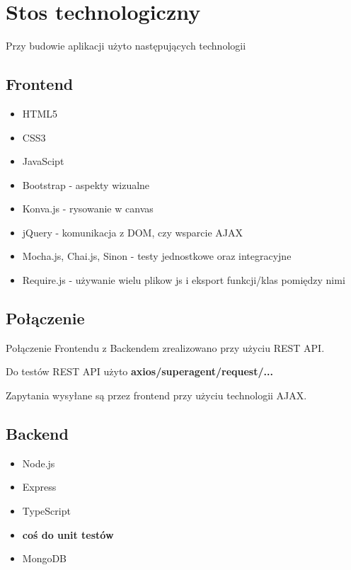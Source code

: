 \section{Stos technologiczny}

Przy budowie aplikacji użyto następujących technologii

\subsection{Frontend}
\begin{itemize}
	\item HTML5
	\item CSS3
	\item JavaScipt
	\item Bootstrap - aspekty wizualne
	\item Konva.js - rysowanie w canvas
	\item jQuery - komunikacja z DOM, czy wsparcie AJAX
	\item Mocha.js, Chai.js, Sinon - testy jednostkowe oraz integracyjne
	\item Require.js - używanie wielu plikow js i eksport funkcji/klas pomiędzy nimi
\end{itemize}

\subsection{Połączenie}
Połączenie Frontendu z Backendem zrealizowano przy użyciu REST API.

Do testów REST API użyto \textbf{axios/superagent/request/...}

Zapytania wysyłane są przez frontend przy użyciu technologii AJAX.

\subsection{Backend}
\begin{itemize}
	\item Node.js
	\item Express
	\item TypeScript
	\item \textbf{coś do unit testów}
	\item MongoDB
\end{itemize}